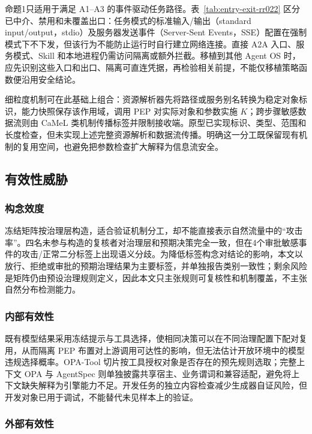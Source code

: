 命题1只适用于满足 A1--A3 的事件驱动任务路径。表~\ref{tab:entry-exit-rr022} 区分已中介、禁用和未覆盖出口：任务模式的标准输入/输出（standard input/output，stdio）及服务器发送事件（Server-Sent Events，SSE）配置在强制模式下不下发，但该行为不能防止运行时自行建立网络连接。直接 A2A 入口、服务模式、Skill 和本地进程仍需访问隔离或额外拦截。移植到其他 Agent OS 时，应先识别这些入口和出口、隔离可直连凭据，再检验相关前提，不能仅移植策略函数便沿用安全结论。

细粒度机制可在此基础上组合：资源解析器先将路径或服务别名转换为稳定对象标识，能力快照保存该作用域，调用 PEP 对实际对象和参数实施 $K$；跨步骤敏感数据流则由 CaMeL 类机制传播标签并限制接收端。原型已实现标识、类型、范围和长度检查，但未实现上述完整资源解析和数据流传播。明确这一分工既保留现有机制的复用空间，也避免把参数检查扩大解释为信息流安全。

\subsection{有效性威胁}

\subsubsection{构念效度}

冻结矩阵按治理层构造，适合验证机制分工，却不能直接表示自然流量中的“攻击率”。四名未参与构造的复核者对治理层和预期决策完全一致，但在4个审批敏感事件的攻击/正常二分标签上出现语义分歧。为降低标签构念对结论的影响，本文以放行、拒绝或审批的预期治理结果为主要标签，并单独报告类别一致性；剩余风险是矩阵仍由预设治理规则定义，因此本文只主张规则可复核性和机制覆盖，不主张自然分布检测能力。

\subsubsection{内部有效性}

既有模型结果采用冻结提示与工具选择，使相同决策可以在不同治理配置下配对复用，从而隔离 PEP 布置对上游调用可达性的影响，但无法估计开放环境中的模型违规选择概率。OPA-Tool 切片按工具授权对象是否存在的预先规则选取；完整上下文 OPA 与 AgentSpec 则单独披露共享宿主、业务谓词和兼容适配，避免将上下文缺失解释为引擎能力不足。开发任务的独立内容检查减少生成器自证风险，但开发对象已用于调试，不能替代未见样本上的验证。

\subsubsection{外部有效性}


